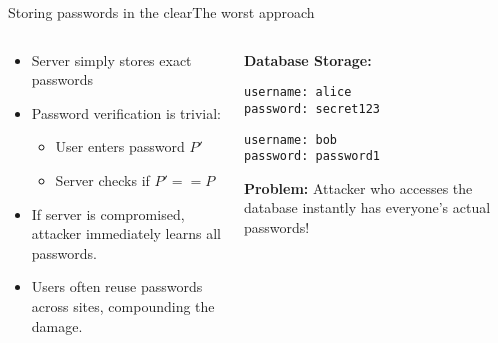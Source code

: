 \documentclass[aspectratio=169, lualatex, handout]{beamer}
\begin{document}
\begin{frame}{Storing passwords in the clear}{The worst approach}
	\begin{columns}[c]
		\begin{column}{0.55\textwidth}
			\begin{itemize}[<+->]
				\item Server simply stores exact passwords
				\item Password verification is trivial:
				      \begin{itemize}
					      \item User enters password $P'$
					      \item Server checks if $P' == P$
				      \end{itemize}
				\item If server is compromised, attacker immediately learns all passwords.
				\item Users often reuse passwords across sites, compounding the damage.
			\end{itemize}
		\end{column}
		\begin{column}{0.45\textwidth}
			\begin{tcolorbox}[colback=black!5!white,colframe=ciphergray]
				\textbf{Database Storage:}

				\vspace{0.2cm}

				\texttt{username: alice}\\
				\texttt{password: secret123}

				\vspace{0.2cm}

				\texttt{username: bob}\\
				\texttt{password: password1}

				\vspace{0.3cm}

				\textcolor{cipherprimary}{\textbf{Problem:} \small Attacker who accesses the database instantly has everyone's actual passwords!}
			\end{tcolorbox}
		\end{column}
	\end{columns}
\end{frame}
\end{document}
